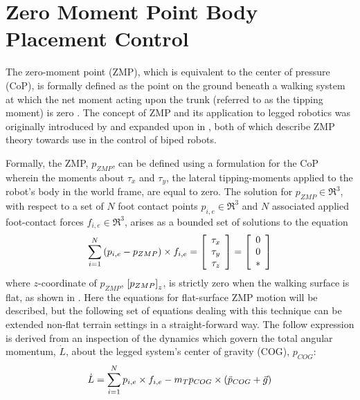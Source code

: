 		\section{Zero Moment Point Body Placement Control}

		The zero-moment point (ZMP), which is equivalent to the center of pressure (CoP), is formally defined as the point on the ground beneath a walking system at which the net moment acting upon the trunk (referred to as the tipping moment) is zero \cite{Sardain2004}. The concept of ZMP and its application to legged robotics was originally introduced by \cite{Vuko1972} and expanded upon in \cite{Goswami1999}, both of which describe ZMP theory towards use in the control of biped robots.

		Formally, the ZMP, $p_{ZMP}$, can be defined using a formulation for the CoP wherein the moments about $\tau_{x}$ and $\tau_{y}$, the lateral tipping-moments applied to the robot's body in the world frame, are equal to zero. The solution for $p_{ZMP}\in\Re^{3}$, with respect to a set of $N$ foot contact points $p_{i,e}\in\Re^{3}$ and $N$ associated applied foot-contact forces $f_{i,e}\in\Re^{3}$, arises as a bounded set of solutions to the equation
			\begin{equation}
				\sum^{N}_{i=1}\left(p_{i,e}-p_{ZMP}\right)\times f_{i,e} 
				= 
				\left[
					\begin{array}{c}
						\tau_{x}	\\
						\tau_{y}	\\
						\tau_{z}
					\end{array}
				\right]
				=
				\left[
					\begin{array}{c}
						0			\\
						0			\\
						*
					\end{array}
				\right]
			\end{equation}
		where $z$-coordinate of $p_{ZMP}$, $\left[p_{ZMP}\right]_{z}$, is strictly zero when the walking surface is flat, as shown in \cite{Wieber2015}. Here the equations for flat-surface ZMP motion will be described, but the following set of equations dealing with this technique can be extended non-flat terrain settings in a straight-forward way. The follow expression is derived from an inspection of the dynamics which govern the total angular momentum, $\dot{L}$, about the legged system's center of gravity (COG), $p_{COG}$:
			\begin{equation}
				\dot{L} = \sum_{i=1}^{N} p_{i,e}\times f_{i,e} - m_{T} p_{COG} \times \left( \ddot{p}_{COG} + \vec{g} \right)
			\end{equation}
